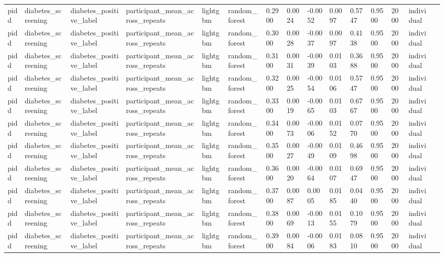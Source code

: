 \begin{tabular}{lllllllllllllll}
pidd & diabetes\_screening & diabetes\_positive\_label & participant\_mean\_across\_repeats & lightgbm & random\_forest & 0.2900 & 0.0024 & -0.0052 & 0.0097 & 0.5747 & 0.9500 & 2000 & individual &  \\
pidd & diabetes\_screening & diabetes\_positive\_label & participant\_mean\_across\_repeats & lightgbm & random\_forest & 0.3000 & 0.0028 & -0.0037 & 0.0097 & 0.4138 & 0.9500 & 2000 & individual &  \\
pidd & diabetes\_screening & diabetes\_positive\_label & participant\_mean\_across\_repeats & lightgbm & random\_forest & 0.3100 & 0.0031 & -0.0039 & 0.0103 & 0.3688 & 0.9500 & 2000 & individual &  \\
pidd & diabetes\_screening & diabetes\_positive\_label & participant\_mean\_across\_repeats & lightgbm & random\_forest & 0.3200 & 0.0025 & -0.0054 & 0.0106 & 0.5747 & 0.9500 & 2000 & individual &  \\
pidd & diabetes\_screening & diabetes\_positive\_label & participant\_mean\_across\_repeats & lightgbm & random\_forest & 0.3300 & 0.0019 & -0.0065 & 0.0103 & 0.6767 & 0.9500 & 2000 & individual &  \\
pidd & diabetes\_screening & diabetes\_positive\_label & participant\_mean\_across\_repeats & lightgbm & random\_forest & 0.3400 & 0.0073 & -0.0006 & 0.0152 & 0.0770 & 0.9500 & 2000 & individual &  \\
pidd & diabetes\_screening & diabetes\_positive\_label & participant\_mean\_across\_repeats & lightgbm & random\_forest & 0.3500 & 0.0027 & -0.0049 & 0.0109 & 0.4698 & 0.9500 & 2000 & individual &  \\
pidd & diabetes\_screening & diabetes\_positive\_label & participant\_mean\_across\_repeats & lightgbm & random\_forest & 0.3600 & 0.0020 & -0.0064 & 0.0107 & 0.6947 & 0.9500 & 2000 & individual &  \\
pidd & diabetes\_screening & diabetes\_positive\_label & participant\_mean\_across\_repeats & lightgbm & random\_forest & 0.3700 & 0.0087 & 0.0005 & 0.0185 & 0.0440 & 0.9500 & 2000 & individual &  \\
pidd & diabetes\_screening & diabetes\_positive\_label & participant\_mean\_across\_repeats & lightgbm & random\_forest & 0.3800 & 0.0069 & -0.0013 & 0.0155 & 0.1079 & 0.9500 & 2000 & individual &  \\
pidd & diabetes\_screening & diabetes\_positive\_label & participant\_mean\_across\_repeats & lightgbm & random\_forest & 0.3900 & 0.0084 & -0.0006 & 0.0183 & 0.0810 & 0.9500 & 2000 & individual &  \\

\end{tabular}
